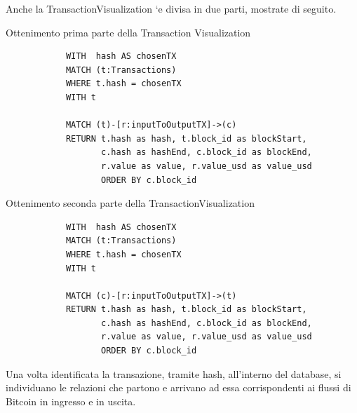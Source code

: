 Anche la TransactionVisualization `e divisa in due parti, mostrate di seguito.
\begin{center}
Ottenimento prima parte della Transaction Visualization
\begin{lstlisting}
            WITH  hash AS chosenTX
            MATCH (t:Transactions)
            WHERE t.hash = chosenTX
            WITH t

            MATCH (t)-[r:inputToOutputTX]->(c)
            RETURN t.hash as hash, t.block_id as blockStart, 
                   c.hash as hashEnd, c.block_id as blockEnd, 
                   r.value as value, r.value_usd as value_usd 
                   ORDER BY c.block_id
\end{lstlisting} 
\end{center}
\vspace{5mm}
\begin{center}
Ottenimento seconda parte della TransactionVisualization
\begin{lstlisting}
            WITH  hash AS chosenTX
            MATCH (t:Transactions)
            WHERE t.hash = chosenTX
            WITH t

            MATCH (c)-[r:inputToOutputTX]->(t)
            RETURN t.hash as hash, t.block_id as blockStart, 
                   c.hash as hashEnd, c.block_id as blockEnd, 
                   r.value as value, r.value_usd as value_usd 
                   ORDER BY c.block_id
\end{lstlisting} 
\end{center}
Una volta identificata la transazione, tramite hash, all'interno del database, si individuano le relazioni che partono e arrivano ad essa corrispondenti ai flussi di Bitcoin in ingresso e in uscita.

